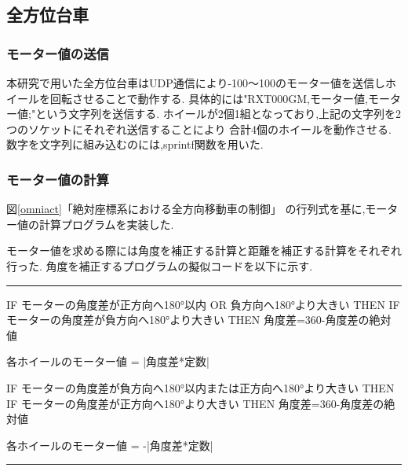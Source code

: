 \subsection{全方位台車}
\subsubsection{モーター値の送信}
本研究で用いた全方位台車はUDP通信により-100～100のモーター値を送信しホイールを回転させることで動作する.
具体的には"RXT000GM,モーター値,モーター値;"という文字列を送信する.
ホイールが2個1組となっており,上記の文字列を2つのソケットにそれぞれ送信することにより
合計4個のホイールを動作させる.
数字を文字列に組み込むのには,sprintf関数を用いた.

\subsubsection{モーター値の計算}
図\ref{omniact}「絶対座標系における全方向移動車の制御」
の行列式を基に,モーター値の計算プログラムを実装した\cite[p15]{Tada}.

\begin{comment}
\begin{figure}[!h]
\begin{center}
\texttt{[image: omniact.eps]}
\caption{絶対座標系における全方位台車の制御}
\label{omniact}
\end{center}
\end{figure}
\end{comment}

\newpage

モーター値を求める際には角度を補正する計算と距離を補正する計算をそれぞれ行った.
角度を補正するプログラムの擬似コードを以下に示す.

\vspace{4zh} 
\hrule width 15cm
\begin{verbatimtab}	
IF モーターの角度差が正方向へ180°以内 OR 負方向へ180°より大きい THEN
		IF モーターの角度差が負方向へ180°より大きい THEN
			角度差=360-角度差の絶対値
	
		各ホイールのモーター値 = |角度差*定数|
		
IF モーターの角度差が負方向へ180°以内または正方向へ180°より大きい THEN
		IF モーターの角度差が正方向へ180°より大きい THEN
			角度差=360-角度差の絶対値
	
		各ホイールのモーター値 = -|角度差*定数|
\end{verbatimtab}
\hrule width 15cm
\vspace{4zh}

